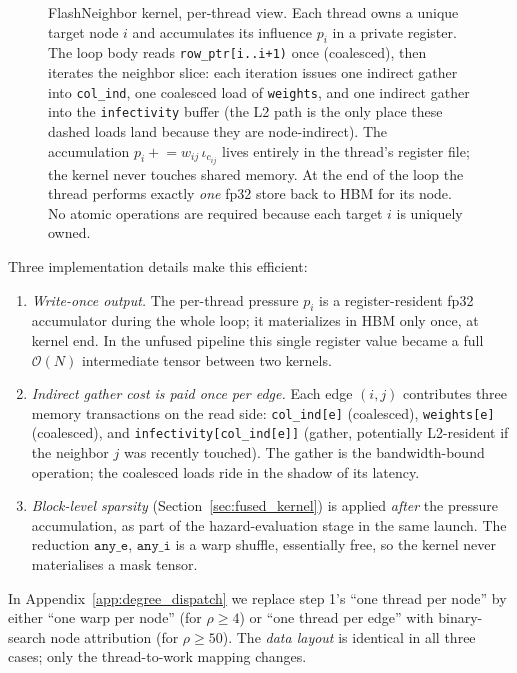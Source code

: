 \documentclass[a4paper,fleqn]{cas-sc}
\theoremstyle{definition}
\theoremstyle{remark}
\newcommand{\bigO}{\mathcal{O}}
\begin{document}
\begin{figure}[htbp]
\centering

\caption{FlashNeighbor kernel, per-thread view. Each thread owns a unique target node $i$ and accumulates its influence $p_i$ in a private register. The loop body reads \texttt{row\_ptr[i..i+1)} once (coalesced), then iterates the neighbor slice: each iteration issues one indirect gather into \texttt{col\_ind}, one coalesced load of \texttt{weights}, and one indirect gather into the \texttt{infectivity} buffer (the L2 path is the only place these dashed loads land because they are node-indirect). The accumulation $p_i \mathrel{+}= w_{ij}\,\iota_{c_{ij}}$ lives entirely in the thread's register file; the kernel never touches shared memory. At the end of the loop the thread performs exactly \emph{one} fp32 store back to HBM for its node. No atomic operations are required because each target $i$ is uniquely owned.}
\label{fig:flashneighbor}
\end{figure}

Three implementation details make this efficient:
\begin{enumerate}
\item \emph{Write-once output.} The per-thread pressure $p_i$ is a register-resident fp32 accumulator during the whole loop; it materializes in HBM only once, at kernel end. In the unfused pipeline this single register value became a full $\bigO(N)$ intermediate tensor between two kernels.
\item \emph{Indirect gather cost is paid once per edge.} Each edge $(i,j)$ contributes three memory transactions on the read side: \texttt{col\_ind[e]} (coalesced), \texttt{weights[e]} (coalesced), and \texttt{infectivity[col\_ind[e]]} (gather, potentially L2-resident if the neighbor $j$ was recently touched). The gather is the bandwidth-bound operation; the coalesced loads ride in the shadow of its latency.
\item \emph{Block-level sparsity} (Section~\ref{sec:fused_kernel}) is applied \emph{after} the pressure accumulation, as part of the hazard-evaluation stage in the same launch. The reduction $\texttt{any\_e}$, $\texttt{any\_i}$ is a warp shuffle, essentially free, so the kernel never materialises a mask tensor.
\end{enumerate}

In Appendix~\ref{app:degree_dispatch} we replace step 1's ``one thread per node'' by either ``one warp per node'' (for $\rho \geq 4$) or ``one thread per edge'' with binary-search node attribution (for $\rho \geq 50$). The \emph{data layout} is identical in all three cases; only the thread-to-work mapping changes.
\end{document}

